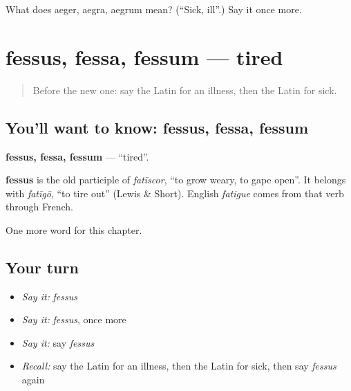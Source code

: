 \begin{tcolorbox}[breakable,colback=teal!4,colframe=teal!35!black,title={Before you move on}]
What does aeger, aegra, aegrum mean? (\textquotedblleft{}Sick, ill\textquotedblright{}.) Say it once more.
\end{tcolorbox}
\section[fessus, fessa, fessum]{fessus, fessa, fessum — tired}

\label{lesson:LA-C68-fessus}



\begin{quote}
Before the new one: say the Latin for an illness, then the Latin for sick.
\end{quote}

\subsection*{You'll want to know: fessus, fessa, fessum}
\textbf{fessus, fessa, fessum} — \textquotedblleft{}tired\textquotedblright{}.

\begin{cousinweb}
\textbf{fessus} is the old participle of \emph{fatīscor}, \textquotedblleft{}to grow weary, to gape open\textquotedblright{}. It belongs with \emph{fatīgō}, \textquotedblleft{}to tire out\textquotedblright{} (Lewis \& Short). English \emph{fatigue} comes from that verb through French.
\end{cousinweb}

\begin{grammarlens}[title={What you've built}]
One more word for this chapter.
\end{grammarlens}

\subsection*{Your turn}
\begin{itemize}
\raggedright
  \item \emph{Say it:} \emph{fessus}
  \item \emph{Say it:} \emph{fessus}, once more
  \item \emph{Say it:} say \emph{fessus}
  \item \emph{Recall:} say the Latin for an illness, then the Latin for sick, then say \emph{fessus} again
\end{itemize}


